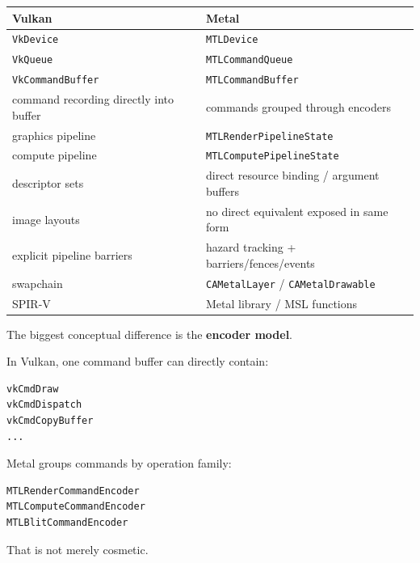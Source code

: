 {\def\LTcaptype{none} %
\begin{longtable}[]{@{}
  >{\raggedright\arraybackslash}p{}
  >{\raggedright\arraybackslash}p{}@{}}
\toprule\noalign{}
\begin{minipage}[b]{\linewidth}\raggedright
Vulkan
\end{minipage} & \begin{minipage}[b]{\linewidth}\raggedright
Metal
\end{minipage} \\
\midrule\noalign{}
\endhead
\bottomrule\noalign{}
\endlastfoot
\texttt{VkDevice} & \texttt{MTLDevice} \\
\texttt{VkQueue} & \texttt{MTLCommandQueue} \\
\texttt{VkCommandBuffer} & \texttt{MTLCommandBuffer} \\
command recording directly into buffer & commands grouped through encoders \\
graphics pipeline & \texttt{MTLRenderPipelineState} \\
compute pipeline & \texttt{MTLComputePipelineState} \\
descriptor sets & direct resource binding / argument buffers \\
image layouts & no direct equivalent exposed in same form \\
explicit pipeline barriers & hazard tracking + barriers/fences/events \\
swapchain & \texttt{CAMetalLayer} / \texttt{CAMetalDrawable} \\
SPIR-V & Metal library / MSL functions \\
\end{longtable}
}

The biggest conceptual difference is the \textbf{encoder model}.

In Vulkan, one command buffer can directly contain:

\begin{verbatim}
vkCmdDraw
vkCmdDispatch
vkCmdCopyBuffer
...
\end{verbatim}

Metal groups commands by operation family:

\begin{verbatim}
MTLRenderCommandEncoder
MTLComputeCommandEncoder
MTLBlitCommandEncoder
\end{verbatim}

That is not merely cosmetic.

